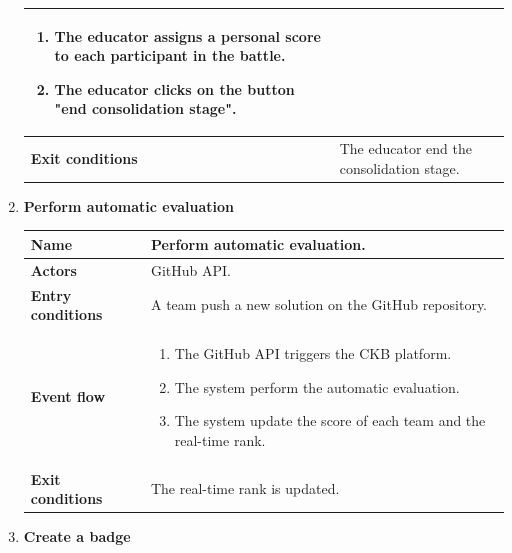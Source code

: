 \begin{enumerate}[label=\textbf{UC.\arabic*}]
\begin{table}[H]
\begin{tabular}{|m{3.2cm}|m{9.8cm}|}
\begin{enumerate}[label=\arabic*.]
                        \item The educator assigns a personal score to each participant in the battle.
                        \item The educator clicks on the button "end consolidation stage".
                    \end{enumerate}\\ 
                    \hline
                    \textbf{Exit conditions}  &  The educator end the consolidation stage. \\
                    \hline
                \end{tabular}
        \end{table}
        \item {} \textbf{Perform automatic evaluation}
        \begin{table}[H]
    	    \centering
                \renewcommand{\arraystretch}{1.5}
                \begin{tabular}{|m{3.2cm}|m{9.8cm}|}
                    \hline
                    \textbf{Name} & Perform automatic evaluation. \\
                    \hline
                    \textbf{Actors} & GitHub API. \\
                    \hline
                    \textbf{Entry conditions}  & A team push a new solution on the GitHub repository. \\
                    \hline
                    \textbf{Event flow}  & 
                    \begin{enumerate}[label=\arabic*.]
                        \item The GitHub API triggers the CKB platform.
                        \item The system perform the automatic evaluation.
                        \item The system update the score of each team and the real-time rank.
                    \end{enumerate}\\ 
                    \hline
                    \textbf{Exit conditions}  &  The real-time rank is updated. \\
                    \hline
                \end{tabular}
        \end{table}
        \item {} \textbf{Create a badge}
        \begin{table}[H]
    	    \centering

\end{table}
\end{enumerate}
